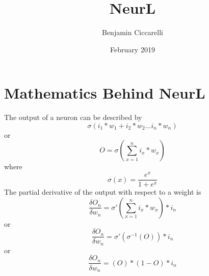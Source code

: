 \documentclass{article}
\title{NeurL}
\author{Benjamin Ciccarelli }
\date{February 2019}
\begin{document}
\maketitle

\section{Mathematics Behind NeurL}

The output of a neuron can be described by
\[ \sigma (i_{1}*w_{1} + i_{2}*w_{2} ... i_{n}*w_{n} ) \]
or 
\[ O = \sigma (\sum_{x = 1}^{n} i_{x}*w_{x}) \]
where
\[ \sigma(x) = \frac{e^{x}}{1+e^{x}} \]
The partial derivative of the output with respect to a weight is
\[ \frac{\delta O_{n}}{\delta w_{n}} = \sigma'(\sum_{x = 1}^{n} i_{x}*w_{x}) * i_{n}  \]
or 
\[ \frac{\delta O_{n}}{\delta w_{n}} = \sigma'(\sigma^{-1}(O)) * i_{n}  \]
or 
\[ \frac{\delta O_{n}}{\delta w_{n}} = (O)*(1-O) * i_{n}  \]
\end{document}
